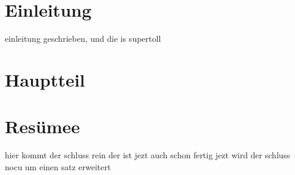 \documentclass[11pt,a4paper]{article}
\begin{document}
\section{Einleitung}

einleitung geschrieben, und die is supertoll

\section{Hauptteil}

\section{Resümee}

hier kommt der schluss rein der ist jezt auch schon fertig
jezt wird der schluss nocu um einen satz erweitert
\end{document}
